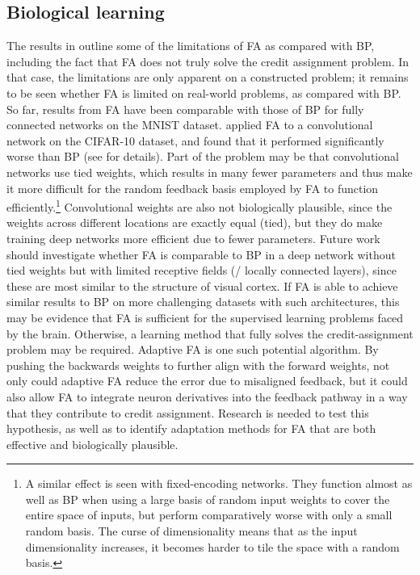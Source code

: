 \subsection{Biological learning}
The results in 
outline some of the limitations of FA as compared with BP,
including the fact that FA does not truly solve the credit assignment problem.
In that case, the limitations are only apparent on a constructed problem;
it remains to be seen whether FA is limited on real-world problems,
as compared with BP.
So far, results from FA have been comparable with those of BP
for fully connected networks on the MNIST dataset.
\textcite{Nokland2016} applied FA to a convolutional network
on the CIFAR-10 dataset,
and found that it performed significantly worse than BP (see  for details).
Part of the problem may be that convolutional networks use tied weights,
which results in many fewer parameters and thus make it more difficult
for the random feedback basis employed by FA
to function efficiently.\footnote{
  A similar effect is seen with fixed-encoding networks.
  They function almost as well as BP when using a large basis of random input weights
  to cover the entire space of inputs,
  but perform comparatively worse with only a small random basis.
  The curse of dimensionality means that as the input dimensionality increases,
  it becomes harder to tile the space with a random basis.}
Convolutional weights are also not biologically plausible,
since the weights across different locations are exactly equal (tied),
but they do make training deep networks more efficient due to fewer parameters.
Future work should investigate whether FA is comparable to BP in a deep network
without tied weights but with limited receptive fields (\ie/ locally connected layers),
since these are most similar to the structure of visual cortex.
If FA is able to achieve similar results to BP
on more challenging datasets with such architectures,
this may be evidence that FA is sufficient
for the supervised learning problems faced by the brain.
Otherwise, a learning method that fully solves the credit-assignment problem
may be required.
Adaptive FA is one such potential algorithm.
By pushing the backwards weights to further align with the forward weights,
not only could adaptive FA reduce the error due to misaligned feedback,
but it could also allow FA to integrate neuron derivatives into the feedback pathway
in a way that they contribute to credit assignment.
Research is needed to test this hypothesis,
as well as to identify adaptation methods for FA
that are both effective and biologically plausible.

